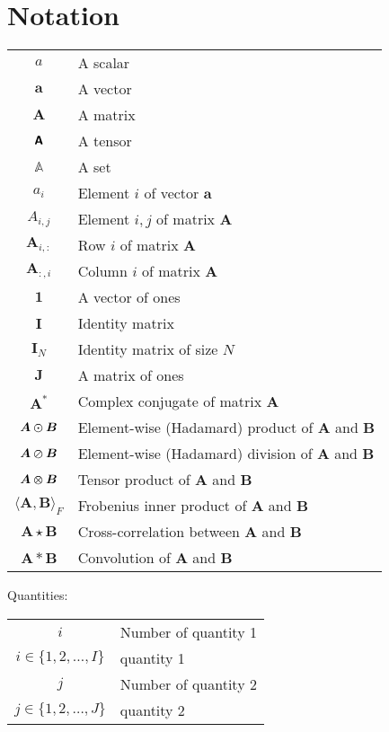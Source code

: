 
\chapter*{Notation}\label{ch:notation}

\begin{center}
    \begin{tabular}{ c l }
        $a$ & A scalar \\
        $\bm{a}$ & A vector \\
        $\bm{A}$ & A matrix \\
        $\textbf{\textsf{A}}$ & A tensor \\
        $\mathbb{A}$ & A set \\

        $a_i$ & Element $i$ of vector $\bm{a}$ \\

        $A_{i, j}$ & Element $i, j$ of matrix $\bm{A}$ \\
        $\bm{A}_{i,:}$ & Row $i$ of matrix $\bm{A}$ \\
        $\bm{A}_{:,i}$ & Column $i$ of matrix $\bm{A}$ \\

        $\bm{1}$ & A vector of ones \\
        $\bm{I}$ & Identity matrix \\
        $\bm{I}_N$ & Identity matrix of size $N$ \\
        $\bm{J}$ & A matrix of ones \\
        $\bm{A}^*$ & Complex conjugate of matrix $\bm{A}$ \\

        $\bm{A} \varodot \bm{B}$ & Element-wise (Hadamard) product of $\bm{A}$ and $\bm{B}$ \\
        $\bm{A} \varoslash \bm{B}$ & Element-wise (Hadamard) division of $\bm{A}$ and $\bm{B}$ \\
        $\bm{A} \varotimes \bm{B}$ & Tensor product of $\bm{A}$ and $\bm{B}$ \\

        $\langle \bm{A}, \bm{B} \rangle_F$ & Frobenius inner product of $\bm{A}$ and $\bm{B}$ \\
        $\bm{A} \star \bm{B}$ & Cross-correlation between $\bm{A}$ and $\bm{B}$ \\
        $\bm{A} * \bm{B}$ & Convolution of $\bm{A}$ and $\bm{B}$
    \end{tabular}
\end{center}

Quantities:

\begin{center}
    \begin{tabular}{ c l }
        $i$ & Number of quantity 1 \\
        $i \in \{ 1, 2, \ldots, I \}$ & quantity 1 \\
        $j$ & Number of quantity 2 \\
        $j \in \{ 1, 2, \ldots, J \}$ & quantity 2
    \end{tabular}
\end{center}


